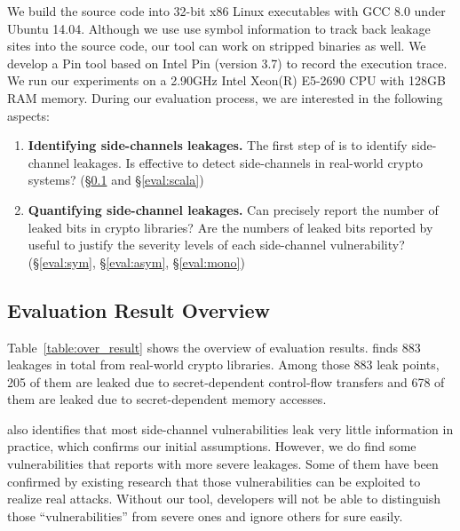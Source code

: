 We build the source code into 32-bit x86 Linux executables with GCC 8.0
under Ubuntu 14.04. Although we use use symbol information to track back leakage
sites into the source code, our tool can work on stripped binaries as well. We
develop a Pin tool based on Intel Pin (version 3.7) to record the execution
trace. We run our experiments on a 2.90GHz Intel Xeon(R) E5-2690 CPU with 128GB
RAM memory. During our evaluation process, we are interested in the following
aspects:
\begin{enumerate}
    \item  \textbf{Identifying side-channels leakages.}
          The first step of \tool{} is to identify side-channel leakages. Is
          \tool{} effective to detect side-channels in real-world crypto
          systems? (\S\ref{sec:eval_overview} and \S\ref{eval:scala})
    \item  \textbf{Quantifying side-channel leakages.}
          Can \tool{} precisely report the number of leaked bits in crypto
          libraries? Are the numbers of leaked bits reported by \tool{} useful
          to justify the severity levels of each side-channel vulnerability?
          (\S\ref{eval:sym}, \S\ref{eval:asym}, \S\ref{eval:mono})
\end{enumerate}

\subsection{Evaluation Result Overview} \label{sec:eval_overview}
Table~\ref{table:over_result} shows the overview of evaluation results. \tool{} finds
883 leakages in total from real-world crypto libraries. Among those 883
leak points, 205 of them are leaked due to secret-dependent control-flow
transfers and 678 of them are leaked due to secret-dependent memory accesses.

\tool{} also identifies that most side-channel
vulnerabilities leak very little information in practice, which confirms our
initial assumptions.  
However, we do find some vulnerabilities that \tool{} reports with more severe
leakages. Some of them have been confirmed by existing research that those
vulnerabilities can be exploited to realize real attacks.
Without our tool, developers will not be able to
distinguish those ``vulnerabilities'' from severe ones and ignore others for sure easily.

